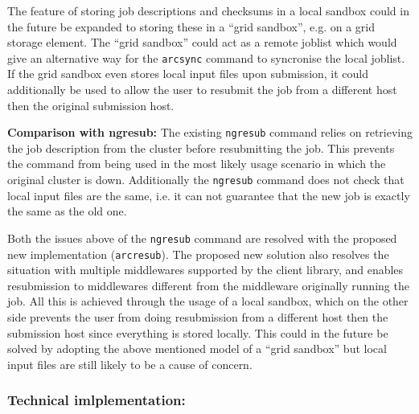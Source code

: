 \documentclass[11pt,oneside,a4paper,english]{article}
\begin{document}
The feature of storing job descriptions and checksums in a local sandbox could in the future be expanded to storing these in a ``grid sandbox'', e.g. on a grid storage element. The ``grid sandbox'' could act as a remote joblist which would give an alternative way for the \texttt{arcsync} command to syncronise the local joblist. If the grid sandbox even stores local input files upon submission, it could additionally be used to allow the user to resubmit the job from a different host then the original submission host.

{\bf Comparison with ngresub:} The existing \texttt{ngresub} command relies on retrieving the job description from the cluster before resubmitting the job. This prevents the command from being used in the most likely usage scenario in which the original cluster is down. Additionally the \texttt{ngresub} command does not check that local input files are the same, i.e. it can not guarantee that the new job is exactly the same as the old one. 

Both the issues above of the \texttt{ngresub} command are resolved with the proposed new implementation (\texttt{arcresub}). The proposed new solution also resolves the situation with multiple middlewares supported by the client library, and enables resubmission to middlewares different from the middleware originally running the job. All this is achieved through the usage of a local sandbox, which on the other side prevents the user from doing resubmission from a different host then the submission host since everything is stored locally. This could in the future be solved by adopting the above mentioned model of a ``grid sandbox'' but local input files are still likely to be a cause of concern.     

\subsubsection*{Technical imlplementation:}
\end{document}
